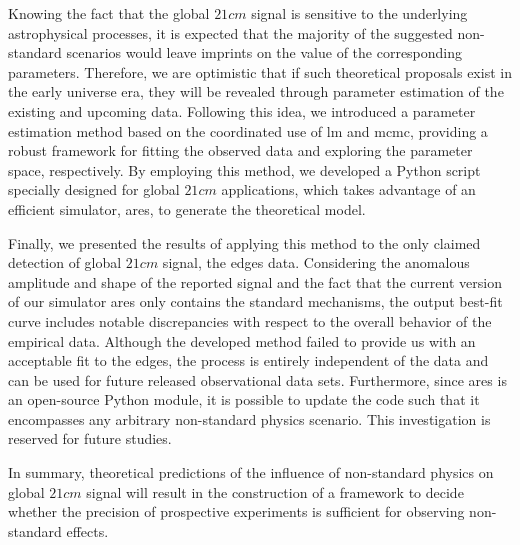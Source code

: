 \documentclass[12pt, TexShade, letterpaper]{report}
\begin{document}
Knowing the fact that the global $21cm$ signal is sensitive to the underlying astrophysical processes, it is expected that the majority of the suggested non-standard scenarios would leave imprints on the value of the corresponding parameters. Therefore, we are optimistic that if such theoretical proposals exist in the early universe era, they will be revealed through parameter estimation of the existing and upcoming data. Following this idea, we introduced a parameter estimation method based on the coordinated use of \gls{lm} and \gls{mcmc}, providing a robust framework for fitting the observed data and exploring the parameter space, respectively. By employing this method, we developed a Python script specially designed for global $21cm$ applications, which takes advantage of an efficient simulator, \gls{ares}, to generate the theoretical model.\par

Finally, we presented the results of applying this method to the only claimed detection of global $21cm$ signal, the \gls{edges} data. Considering the anomalous amplitude and shape of the reported signal and the fact that the current version of our simulator \gls{ares} only contains the standard mechanisms, the output best-fit curve includes notable discrepancies with respect to the overall behavior of the empirical data. Although the developed method failed to provide us with an acceptable fit to the \gls{edges}, the process is entirely independent of the data and can be used for future released observational data sets. Furthermore, since \gls{ares} is an open-source Python module, it is possible to update the code such that it encompasses any arbitrary non-standard physics scenario. This investigation is reserved for future studies.\par

In summary, theoretical predictions of the influence of non-standard physics on global $21cm$ signal will result in the construction of a framework to decide whether the precision of prospective experiments is sufficient for observing non-standard effects.\par

\end{document}

